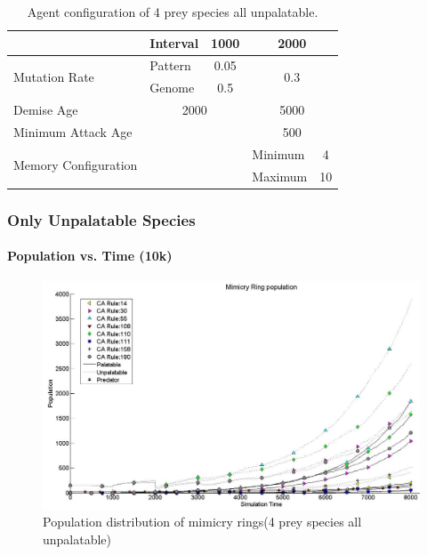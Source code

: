 {\begin{table}[H]
\begin{tiny}
\begin{spacing}{1.5}
\begin{tabular}{|l|l|c|c|l|c|}
	  						 									& Interval  & \multicolumn{2}{|c|}{1000} & \multicolumn{2}{|c|}{2000} \\ \hline
	  \multirow{2}{*}{Mutation Rate} & Pattern   & \multicolumn{2}{|c|}{0.05} & \multicolumn{2}{|c|}{\multirow{2}{*}{0.3}} \\ \cline{2-4}
	  						 									 & Genome    & \multicolumn{2}{|c|}{0.5}  & \multicolumn{2}{|c|}{} \\ \hline
	  Demise Age	 									 & \multicolumn{3}{|c|}{2000}							& \multicolumn{2}{|c|}{5000} \\ \hline
	  Minimum Attack Age						 & \multicolumn{3}{|c|}{} 						    & \multicolumn{2}{|c|}{500} \\ \hline
	  \multirow{2}{*}{Memory Configuration} & \multicolumn{3}{|c|}{} 					& Minimum & 4 \\ \cline{5-6}
	   																			& \multicolumn{3}{|c|}{} 					& Maximum & 10 \\ \hline  
	\end{tabular}
	\end{spacing}
	\end{tiny}
	\caption{Agent configuration of 4 prey species all unpalatable.}
	\label{tab:config-table-4-prey-unpalatable}
	\end{table}	

}

\frame
{
	\frametitle{Only Unpalatable Species}
	\framesubtitle{Population vs. Time (10k)}

	\begin{figure}[H]
		\centering
		\includegraphics[scale=0.25]{../tex/images/simTime8k-4Prey-unp}
		\caption{Population distribution of mimicry rings(4 prey species all unpalatable)}
		\label{fig:plot-4-prey-unp}
	\end{figure}

}

